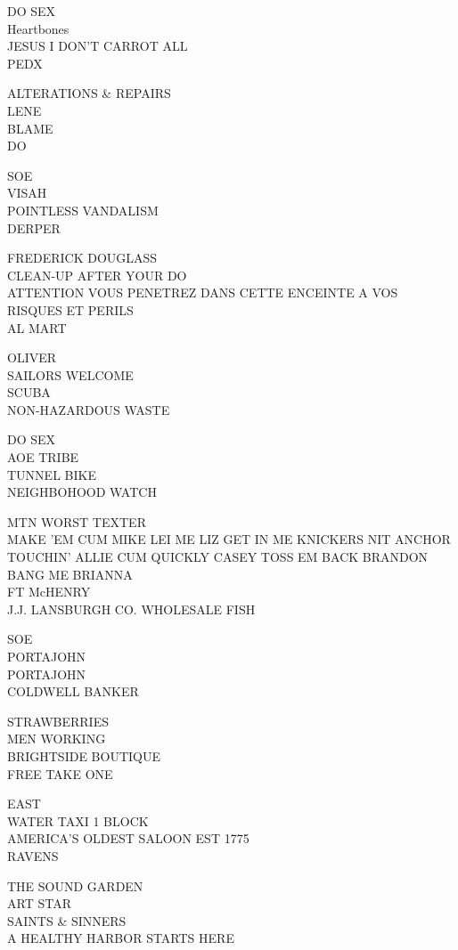 \documentclass[10pt,letterpaper]{article}
\begin{document}
DO SEX\\
Heartbones\\
JESUS I DON'T CARROT ALL\\
PEDX

ALTERATIONS \& REPAIRS\\
LENE\\
BLAME\\
DO

SOE\\
VISAH\\
POINTLESS VANDALISM\\
DERPER

FREDERICK DOUGLASS\\
CLEAN{-}UP AFTER YOUR DO\\
ATTENTION VOUS PENETREZ DANS CETTE ENCEINTE A VOS RISQUES ET PERILS\\
AL MART

OLIVER\\
SAILORS WELCOME\\
SCUBA\\
NON{-}HAZARDOUS WASTE

DO SEX\\
AOE TRIBE\\
TUNNEL BIKE\\
NEIGHBOHOOD WATCH

MTN WORST TEXTER\\
MAKE 'EM CUM MIKE LEI ME LIZ GET IN ME KNICKERS NIT ANCHOR TOUCHIN' ALLIE CUM QUICKLY CASEY TOSS EM BACK BRANDON BANG ME BRIANNA\\
FT McHENRY\\
J.J. LANSBURGH CO. WHOLESALE FISH

SOE\\
PORTAJOHN\\
PORTAJOHN\\
COLDWELL BANKER

STRAWBERRIES\\
MEN WORKING\\
BRIGHTSIDE BOUTIQUE\\
FREE TAKE ONE

EAST\\
WATER TAXI 1 BLOCK\\
AMERICA'S OLDEST SALOON EST 1775\\
RAVENS

THE SOUND GARDEN\\
ART STAR\\
SAINTS \& SINNERS\\
A HEALTHY HARBOR STARTS HERE
\end{document}
